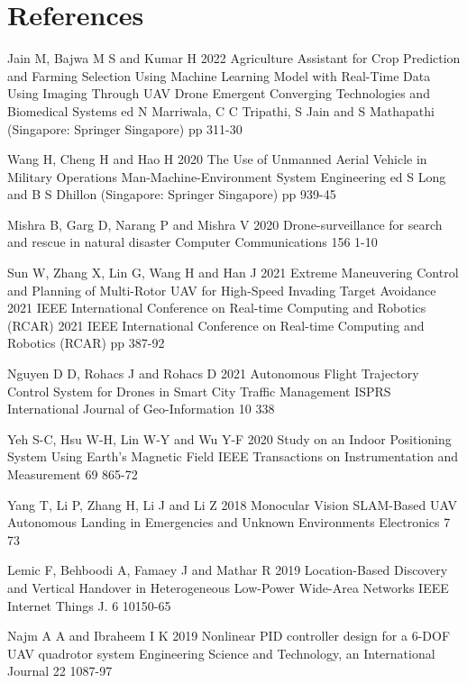 \documentclass[a4paper]{jpconf}
\begin{document}
\section*{References}
\begin{thebibliography}{12}
     Jain M, Bajwa M S and Kumar H 2022 Agriculture Assistant for Crop Prediction and Farming Selection Using Machine Learning Model with Real-Time Data Using Imaging Through UAV Drone Emergent Converging Technologies and Biomedical Systems ed N Marriwala, C C Tripathi, S Jain and S Mathapathi (Singapore: Springer Singapore) pp 311-30

     Wang H, Cheng H and Hao H 2020 The Use of Unmanned Aerial Vehicle in Military Operations Man-Machine-Environment System Engineering ed S Long and B S Dhillon (Singapore: Springer Singapore) pp 939-45

     Mishra B, Garg D, Narang P and Mishra V 2020 Drone-surveillance for search and rescue in natural disaster Computer Communications 156 1-10

     Sun W, Zhang X, Lin G, Wang H and Han J 2021 Extreme Maneuvering Control and Planning of Multi-Rotor UAV for High-Speed Invading Target Avoidance 2021 IEEE International Conference on Real-time Computing and Robotics (RCAR) 2021 IEEE International Conference on Real-time Computing and Robotics (RCAR) pp 387-92

     Nguyen D D, Rohacs J and Rohacs D 2021 Autonomous Flight Trajectory Control System for Drones in Smart City Traffic Management ISPRS International Journal of Geo-Information 10 338

     Yeh S-C, Hsu W-H, Lin W-Y and Wu Y-F 2020 Study on an Indoor Positioning System Using Earth's Magnetic Field IEEE Transactions on Instrumentation and Measurement 69 865-72

     Yang T, Li P, Zhang H, Li J and Li Z 2018 Monocular Vision SLAM-Based UAV Autonomous Landing in Emergencies and Unknown Environments Electronics 7 73

     Lemic F, Behboodi A, Famaey J and Mathar R 2019 Location-Based Discovery and Vertical Handover in Heterogeneous Low-Power Wide-Area Networks IEEE Internet Things J. 6 10150-65

     Najm A A and Ibraheem I K 2019 Nonlinear PID controller design for a 6-DOF UAV quadrotor system Engineering Science and Technology, an International Journal 22 1087-97


\end{thebibliography}
\end{document}
